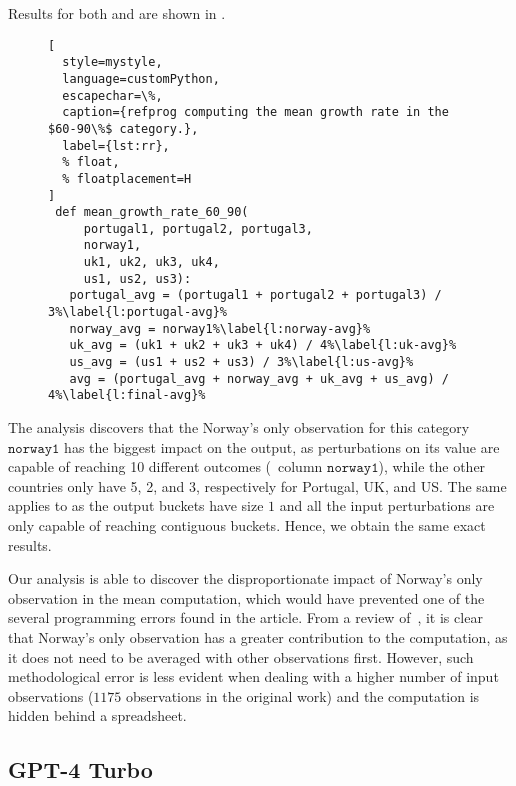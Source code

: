 %
Results for both \outcomesname{} and \rangename{} are shown in .
\begin{figure}[t]
  \centering
\begin{lstlisting}[
  style=mystyle,
  language=customPython,
  escapechar=\%,
  caption={refprog computing the mean growth rate in the $60-90\%$ category.},
  label={lst:rr},
  % float,
  % floatplacement=H
]
 def mean_growth_rate_60_90(
     portugal1, portugal2, portugal3,
     norway1,
     uk1, uk2, uk3, uk4,
     us1, us2, us3):
   portugal_avg = (portugal1 + portugal2 + portugal3) / 3%\label{l:portugal-avg}%
   norway_avg = norway1%\label{l:norway-avg}%
   uk_avg = (uk1 + uk2 + uk3 + uk4) / 4%\label{l:uk-avg}%
   us_avg = (us1 + us2 + us3) / 3%\label{l:us-avg}%
   avg = (portugal_avg + norway_avg + uk_avg + us_avg) / 4%\label{l:final-avg}%
\end{lstlisting}
\end{figure}
%
%
The analysis discovers that the Norway's only observation for this category $\texttt{norway1}$ has the biggest impact on the output, as perturbations on its value are capable of reaching 10 different outcomes (\cf~column $\texttt{norway1}$), while the other countries only have 5, 2, and 3, respectively for Portugal, UK, and US.
The same applies to \rangename{} as the output buckets have size $1$ and all the input perturbations are only capable of reaching contiguous buckets. Hence, we obtain the same exact results.

Our analysis is able to discover the disproportionate impact of Norway's only observation in the mean computation, which would have prevented one of the several programming errors found in the article.
From a review of~, it is clear that Norway's only observation has a greater contribution to the computation,
as it does not need to be averaged with other observations first.
However, such methodological error is less evident when dealing with a higher number of input observations ($1175$ observations in the original work) and the computation is hidden behind a spreadsheet.



\subsection{GPT-4 Turbo}

